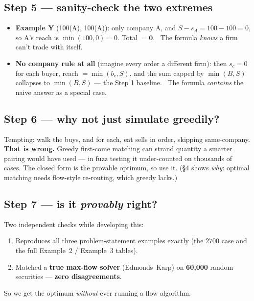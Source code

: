 \subsection{Step 5 --- sanity-check the two extremes}

\begin{itemize}[leftmargin=1.4em]
  \item \textbf{Example Y} (\Buy{}100(A), \Sell{}100(A)): only company A, and
        $S-s_A = 100-100 = 0$, so A's reach is $\min(100,0)=0$. Total $=\mathbf{0}$.
        \checkmark\ The formula \emph{knows} a firm can't trade with itself.
  \item \textbf{No company rule at all} (imagine every order a different firm):
        then $s_c=0$ for each buyer, reach $=\min(b_c,S)$, and the sum capped by
        $\min(B,S)$ collapses to $\min(B,S)$ --- the Step 1 baseline. \checkmark\
        The formula \emph{contains} the naive answer as a special case.
\end{itemize}

\subsection{Step 6 --- why not just simulate greedily?}

Tempting: walk the buys, and for each, eat sells in order, skipping same-company.
\textbf{That is wrong.} Greedy first-come matching can strand quantity a smarter
pairing would have used --- in fuzz testing it under-counted on thousands of
cases. The closed form is the provable optimum, so use it. (\S4 shows \emph{why}:
optimal matching needs flow-style re-routing, which greedy lacks.)

\subsection{Step 7 --- is it \emph{provably} right?}

Two independent checks while developing this:
\begin{enumerate}[leftmargin=1.4em]
  \item Reproduces all three problem-statement examples exactly (the $2700$ case
        and the full Example~2 / Example~3 tables).
  \item Matched a \textbf{true max-flow solver} (Edmonds--Karp) on
        \textbf{60{,}000} random securities --- \textbf{zero disagreements}.
\end{enumerate}
So we get the optimum \emph{without} ever running a flow algorithm.

